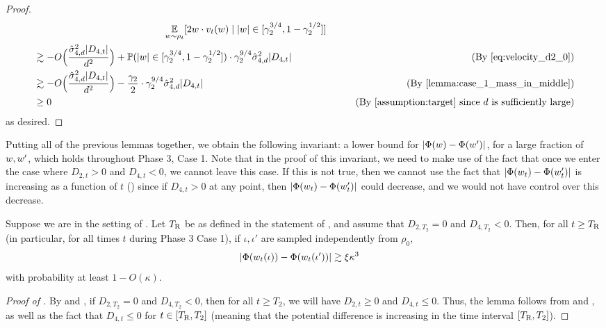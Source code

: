 \begin{proof}
\begin{align}
& \nextlinespace\nextlinespace\nextlinespace\nextlinespace\nextlinespace \E_{\w \sim \rho_t}[2\w \cdot \vel_t(\w) \mid |\w| \in [\gamma_2^{3/4}, 1 - \gamma_2^{1/2}]] \\
& \gtrsim -O\Big(\frac{\sigmaCoeffFour^2 |D_{4, t}|}{d^2}\Big) + \Prob(|\w| \in [\gamma_2^{3/4}, 1 - \gamma_2^{1/2}]) \cdot \gamma_2^{9/4} \sigmaCoeffFour^2 |D_{4, t}|
& \tag{By \Cref{eq:velocity_d2_0}} \\
& \gtrsim -O\Big(\frac{\sigmaCoeffFour^2 |D_{4, t}|}{d^2}\Big) - \frac{\gamma_2}{2} \cdot \gamma_2^{9/4} \sigmaCoeffFour^2 |D_{4, t}|
& \tag{By \Cref{lemma:case_1_mass_in_middle}} \\
& \geq 0
& \tag{By \Cref{assumption:target} since $d$ is sufficiently large}
\end{align}
as desired.
\end{proof}

Putting all of the previous lemmas together, we obtain the following invariant: a lower bound for $|\Phi(w) - \Phi(w')|$, for a large fraction of $w, w'$, which holds throughout Phase 3, Case 1. Note that in the proof of this invariant, we need to make use of the fact that once we enter the case where $D_{2, t} > 0$ and $D_{4, t} < 0$, we cannot leave this case. If this is not true, then we cannot use the fact that $|\Phi(w_t) - \Phi(w_t')|$ is increasing as a function of $t$ () since if $D_{4, t} > 0$ at any point, then $|\Phi(w_t) - \Phi(w_t')|$ could decrease, and we would not have control over this decrease.

\begin{lemma}  \label{lemma:case_1_invariant}
Suppose we are in the setting of . Let ${T_{\textup{R}}}$ be as defined in the statement of , and assume that $D_{2, T_2} = 0$ and $D_{4, T_2} < 0$. Then, for all $t \geq {T_{\textup{R}}}$ (in particular, for all times $t$ during Phase 3 Case 1), if $\iota, \iota'$ are sampled independently from $\rho_0$,
\begin{align}
|\Phi(w_t(\iota)) - \Phi(w_t(\iota'))|
& \gtrsim \xi \kappa^3
\end{align}
with probability at least $1 - O(\kappa)$.
\end{lemma}
\begin{proof}[Proof of ]
By  and , if $D_{2, T_2} = 0$ and $D_{4, T_2} < 0$, then for all $t \geq T_2$, we will have $D_{2, t} \geq 0$ and $D_{4, t} \leq 0$. Thus, the lemma follows from  and , as well as the fact that $D_{4, t} \leq 0$ for $t \in [{T_{\textup{R}}}, T_2]$ (meaning that the potential difference is increasing in the time interval $[{T_{\textup{R}}}, T_2]$).
\end{proof}

